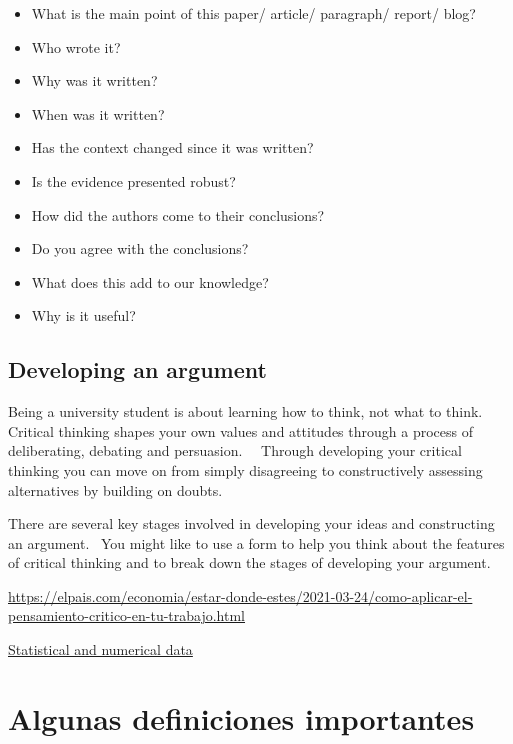 \documentclass[
  letterpaper,
  DIV=11,
  numbers=noendperiod,
  oneside]{scrreprt}
\begin{document}
\begin{itemize}
\item
  What is the main point of this paper/ article/ paragraph/ report/
  blog?
\item
  Who wrote it?
\item
  Why was it written?
\item
  When was it written?
\item
  Has the context changed since it was written?
\item
  Is the evidence presented robust?
\item
  How did the authors come to their conclusions?
\item
  Do you agree with the conclusions?
\item
  What does this add to our knowledge?
\item
  Why is it useful?
\end{itemize}

\hypertarget{developing-an-argument}{%
\subsection{Developing an argument}\label{developing-an-argument}}

Being a university student is about learning how to think, not what to
think.~ Critical thinking shapes your own values and attitudes through a
process of deliberating, debating and persuasion.~~ Through developing
your critical thinking you can move on from simply disagreeing to
constructively assessing alternatives by building on doubts.

There are several key stages involved in developing your ideas and
constructing an argument.~ You might like to use a form to help you
think about the features of critical thinking and to break down the
stages of developing your argument.

\url{https://elpais.com/economia/estar-donde-estes/2021-03-24/como-aplicar-el-pensamiento-critico-en-tu-trabajo.html}

\href{https://www.ed.ac.uk/institute-academic-development/study-hub/learning-resources/statistical-and-numerical-data}{Statistical
and numerical data}

\hypertarget{algunas-definiciones-importantes}{%
\section{Algunas definiciones
importantes}\label{algunas-definiciones-importantes}}
\end{document}
